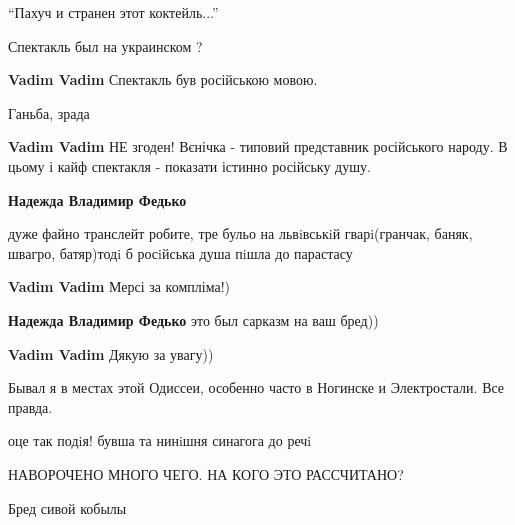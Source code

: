  
 
 
 
 
\zzSecCmt

\begin{itemize} %
\enquote{Пахуч и странен этот коктейль...}

Спектакль был на украинском ?

\begin{itemize} %
\textbf{Vadim Vadim} Спектакль був російською мовою.

\begin{itemize} %
Ганьба, зрада

\textbf{Vadim Vadim} НЕ згоден! Вєнічка - типовий представник російського народу. В цьому і кайф спектакля - показати істинно російську душу.

\textbf{Надежда Владимир Федько} 

дуже файно транслейт робите, тре бульо на львiвськiй
гварi(гранчак, баняк, швагро, батяр)тодi б росiйська душа пiшла до парастасу


\textbf{Vadim Vadim} Мерсі за компліма!)

\textbf{Надежда Владимир Федько} это был сарказм на ваш бред))

\textbf{Vadim Vadim} Дякую за увагу))
\end{itemize} %

\end{itemize} %

Бывал я в местах этой Одиссеи, особенно часто в Ногинске и Электростали. Все правда.

оце так подiя! бувша та нинiшня синагога до речi

НАВОРОЧЕНО МНОГО ЧЕГО. НА КОГО ЭТО РАССЧИТАНО?

Бред сивой кобылы

\end{itemize} %
